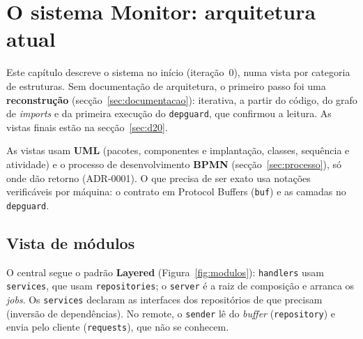 \section{O sistema Monitor: arquitetura atual}
\label{sec:sistema}

Este capítulo descreve o sistema no início (iteração~0), numa vista por categoria de estruturas. Sem documentação de
arquitetura, o primeiro passo foi uma \textbf{reconstrução} (secção~\ref{sec:documentacao}): iterativa, a partir do
código, do grafo de \emph{imports} e da primeira execução do \texttt{depguard}, que confirmou a leitura. As vistas
finais estão na secção~\ref{sec:d20}.

As vistas usam \textbf{UML} (pacotes, componentes e implantação, classes, sequência e atividade) e o processo de
desenvolvimento \textbf{BPMN} (secção~\ref{sec:processo}), só onde dão retorno (ADR-0001). O que precisa de ser
exato usa notações verificáveis por máquina: o contrato em Protocol Buffers (\texttt{buf}) e as camadas no
\texttt{depguard}.

\subsection{Vista de módulos}

O central segue o padrão \textbf{Layered} (Figura~\ref{fig:modulos}): \texttt{handlers} usam \texttt{services}, que
usam \texttt{repositories}; o \texttt{server} é a raiz de composição e arranca os \emph{jobs}. Os \texttt{services}
declaram as interfaces dos repositórios de que precisam (inversão de dependências). No remote, o \texttt{sender} lê
do \emph{buffer} (\texttt{repository}) e envia pelo cliente (\texttt{requests}), que não se conhecem.

